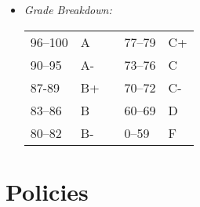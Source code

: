 \documentclass[article,oneside]{memoir}
\begin{document}
\begin{itemize}
\item \textit{Grade Breakdown:}

 \begin{tabular}{ | l | l | p{2cm} | l | l | }
    \hline 
96--100 & A  & &  77--79 &  C+ \\  
90--95 & A- & &  73--76 & C \\
87-89 & B+ &  &  70--72 & C- \\ 
83--86 & B  & &  60--69 & D\\
80--82 & B- & & 0--59 & F\\ \hline
    \end{tabular}


\end{itemize}





\section{Policies}
\end{document}

